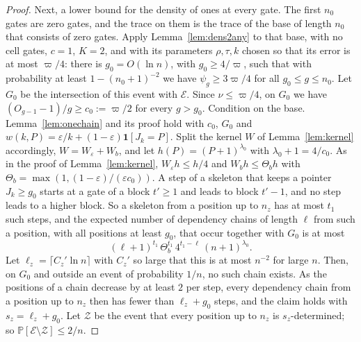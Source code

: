 \documentclass[11pt]{amsart}
\theoremstyle{definition}
\theoremstyle{remark}
\newcommand{\eps}{\varepsilon}
\newcommand{\PP}{\mathbb{P}}
\begin{document}
\begin{proof}
Next, a lower bound for the density of ones at every gate. The first $n_0$ gates are zero gates,
and the trace on them is the trace of the base of length $n_0$ that consists of zero gates. Apply
Lemma~\ref{lem:dens2any} to that base, with no cell gates, $c=1$, $K=2$, and with its parameters
$\rho,\tau,k$ chosen so that its error is at most $\varpi/4$: there is $g_0=O(\ln n)$, with
$g_0\ge4/\varpi$, such that with probability at least $1-(n_0+1)^{-2}$ we have
$\psi_g\ge3\varpi/4$ for all $g_0\le g\le n_0$. Let $G_0$ be the intersection of this event with
$\mathcal E$. Since $\nu\le\varpi/4$, on $G_0$ we have $(O_{g-1}-1)/g\ge c_0:=\varpi/2$ for every
$g>g_0$. Condition on the base. Lemma~\ref{lem:onechain} and its proof hold with $c_0$, $G_0$ and
$w(k,P)=\eps/k+(1-\eps)\mathbf 1[J_k=P]$. Split the kernel $W$ of Lemma~\ref{lem:kernel}
accordingly, $W=W_\eps+W_b$, and let $h(P)=(P+1)^{\lambda_0}$ with $\lambda_0+1=4/c_0$. As in the
proof of Lemma~\ref{lem:kernel}, $W_\eps h\le h/4$ and $W_bh\le\Theta_bh$ with
$\Theta_b=\max(1,(1-\eps)/(\eps c_0))$. A step of a skeleton that keeps a pointer $J_k\ge g_0$
starts at a gate of a block $t'\ge1$ and leads to block $t'-1$, and no step leads to a higher
block. So a skeleton from a position up to $n_z$ has at most $t_1$ such steps, and the expected
number of dependency chains of length $\ell$ from such a position, with all positions at least
$g_0$, that occur together with $G_0$ is at most
\[
(\ell+1)^{t_1}\,\Theta_b^{t_1}\,4^{t_1-\ell}\,(n+1)^{\lambda_0} .
\]
Let $\ell_z=\lceil C_z'\ln n\rceil$ with $C_z'$ so large that this is at most $n^{-2}$ for large
$n$. Then, on $G_0$ and outside an event of probability $1/n$, no such chain exists. As the
positions of a chain decrease by at least $2$ per step, every dependency chain from a position up
to $n_z$ then has fewer than $\ell_z+g_0$ steps, and the claim holds with $s_z=\ell_z+g_0$. Let
$\mathcal Z$ be the event that every position up to $n_z$ is $s_z$-determined; so
$\PP[\mathcal E\setminus\mathcal Z]\le2/n$.


\end{proof}
\end{document}
